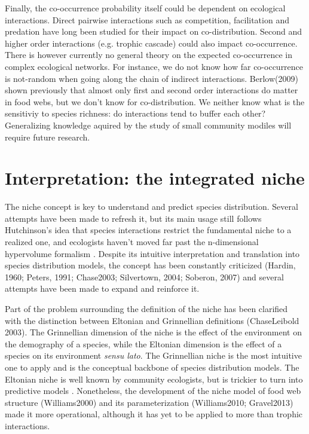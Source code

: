 \documentclass[12pt]{article}
\begin{document}
Finally, the co-occurrence probability itself could be dependent on ecological
interactions. Direct pairwise interactions such as competition, facilitation and
predation have long been studied for their impact on co-distribution. Second and
higher order interactions (e.g. trophic cascade) could also impact
co-occurrence. There is however currently no general theory on the expected
co-occurrence in complex ecological networks. For instance, we do not know how
far co-occurrence is not-random when going along the chain of indirect
interactions. Berlow(2009) shown previously that almost only first and second
order interactions do matter in food webs, but we don't know for
co-distribution. We neither know what is the sensitiviy to species richness: do
interactions tend to buffer each other? Generalizing knowledge aquired by the
study of small community modiles will require future research.

\newpage
\section*{Interpretation: the integrated niche}

The niche concept is key to understand and predict species
distribution. Several attempts have been made to refresh it, but its main
usage still follows Hutchinson’s idea that species interactions restrict
the fundamental niche to a realized one, and ecologists haven't moved far past
the n-dimensional hypervolume formalism \parencite{Blonder2014}. Despite its
intuitive interpretation and translation into species distribution models,
the concept has been constantly criticized (Hardin, 1960; Peters, 1991;
Chase2003; Silvertown, 2004; Soberon, 2007) and several attempts have been
made to expand and reinforce it.

Part of the problem surrounding the definition of the niche has been
clarified with the distinction between Eltonian and Grinnellian definitions
(ChaseLeibold 2003). The Grinnellian dimension of the niche is the effect of
the environment on the demography of a species, while the Eltonian dimension
is the effect of a species on its environment \emph{sensu lato}.  %
The Grinnellian niche is the most intuitive one to apply and is the conceptual
backbone of species distribution models. The Eltonian niche is well known
by community ecologists, but is trickier to turn into predictive models
\parencite{Devictor2010a}. Nonetheless, the development of the niche model
of food web structure (Williams2000) and its parameterization (Williams2010;
Gravel2013) made it more operational, although it has yet to be applied to
more than trophic interactions. %
\end{document}
